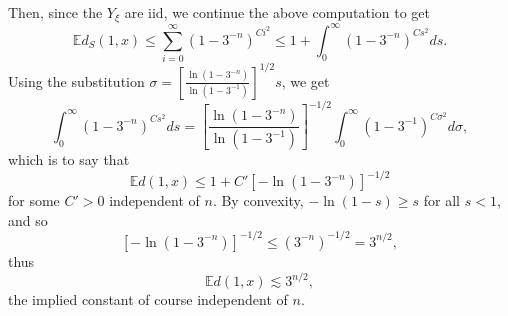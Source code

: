 \documentclass[12pt,reqno]{article}
\numberwithin{equation}{section}
\newcommand{\E}{\mathbb{E}}
\begin{document}
Then, since the $Y_\xi$ are iid, we continue the above computation to get
\[ 
   \E d_S(1,x) \le \sum_{i=0}^{\infty} (1 - 3^{-n})^{C i^2} \le 1 + \int_0^{\infty} (1 - 3^{-n})^{C s^2} ds. 
\]
Using the substitution $\sigma =  \left[ \frac{ \ln (1 - 3^{-n}) }{\ln (1 - 3^{-1}) } \right]^{1/2} s$, we get
\[ 
   \int_{0}^{\infty} (1 - 3^{-n})^{Cs^2} ds =  
   \left[ \frac{ \ln (1 - 3^{-n}) }{\ln (1 - 3^{-1}) } \right]^{-1/2} \int_0^{\infty} (1 - 3^{-1})^{C \sigma^2} d\sigma,
\]
which is to say that 
\[ 
   \E d(1,x) \le 1 + C' [- \ln (1 - 3^{-n} ) ]^{-1/2} 
\]
for some $C' > 0$ independent of $n$.
By convexity, $- \ln ( 1 - s ) \ge s $ for all $s < 1$, and so 
\[ [ - \ln(1 - 3^{-n}) ]^{-1/2} \le (3^{-n})^{-1/2} = 3^{n/2}, \]
thus 
\begin{equation}
   \label{eqn:suburbbound}
   \E d(1,x) \lesssim 3^{n/2},
\end{equation} 
the implied constant of course independent of $n$.
\end{document}
